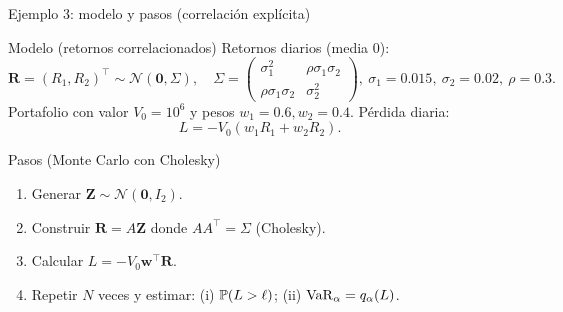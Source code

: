 \documentclass[aspectratio=1610, 9pt]{beamer}
\begin{document}
\begin{frame}{Ejemplo 3: modelo y pasos (correlación explícita)}
\small
\begin{block}{Modelo (retornos correlacionados)}
Retornos diarios (media 0):
\[
\bm{R}=(R_1,R_2)^\top \sim \mathcal{N}(\bm{0},\Sigma),
\quad
\Sigma=
\begin{pmatrix}
\sigma_1^2 & \rho\sigma_1\sigma_2\\
\rho\sigma_1\sigma_2 & \sigma_2^2
\end{pmatrix},
\ 
\sigma_1=0.015,\ \sigma_2=0.02,\ \rho=0.3.
\]
Portafolio con valor $V_0=10^6$ y pesos $w_1=0.6, w_2=0.4$.
Pérdida diaria:
\[
L = -V_0(w_1R_1+w_2R_2).
\]
\end{block}

\begin{block}{Pasos (Monte Carlo con Cholesky)}
\begin{enumerate}
\item Generar $\bm{Z}\sim\mathcal{N}(\bm{0},I_2)$.
\item Construir $\bm{R}=A\bm{Z}$ donde $AA^\top=\Sigma$ (Cholesky).
\item Calcular $L=-V_0\bm{w}^\top \bm{R}$.
\item Repetir $N$ veces y estimar: (i) $\mathbb{P}(L>\ell)$; (ii) $\mathrm{VaR}_\alpha=q_\alpha(L)$.
\end{enumerate}
\end{block}
\end{frame}
\end{document}

